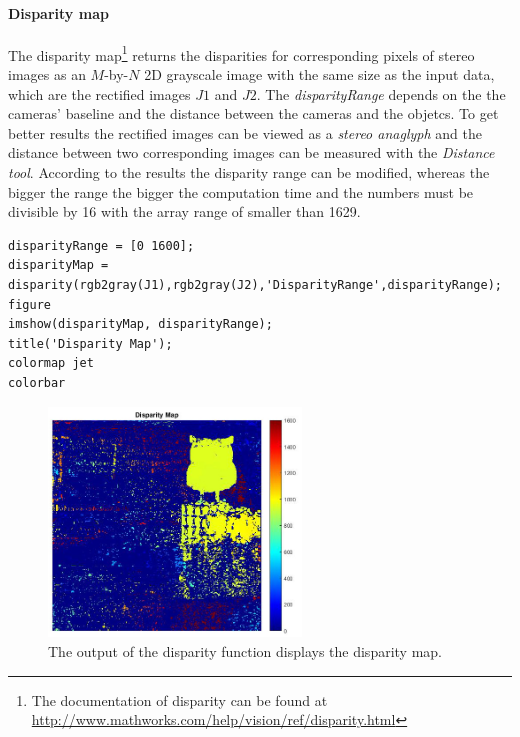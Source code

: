 \paragraph{Disparity map}
The disparity map\footnote{The documentation of disparity can be found at \url{http://www.mathworks.com/help/vision/ref/disparity.html}} returns the disparities for corresponding pixels of stereo images as an $M$-by-$N$ 2D grayscale image with the same size as the input data, which are the rectified images $J1$ and $J2$. The \textit{disparityRange} depends on the the cameras' baseline and the distance between the cameras and the objetcs. To get better results the rectified images can be viewed as a \textit{stereo anaglyph} and the distance between two corresponding images can be measured with the \textit{Distance tool}. According to the results the disparity range can be modified, whereas the bigger the range the bigger the computation time and the numbers must be divisible by 16 with the array range of smaller than 1629.  

\begin{lstlisting}[caption={Display disparity map.}]
disparityRange = [0 1600];
disparityMap = disparity(rgb2gray(J1),rgb2gray(J2),'DisparityRange',disparityRange); 
figure
imshow(disparityMap, disparityRange);
title('Disparity Map');
colormap jet
colorbar
\end{lstlisting}

\begin{figure}[htbp]
		\centering
		\includegraphics[width=0.6\textwidth]{figures/DisparityMap}
		\caption[Output of the disparity function]{The output of the disparity function displays the disparity map.}
		\label{fig:DisparityMap}
\end{figure}

